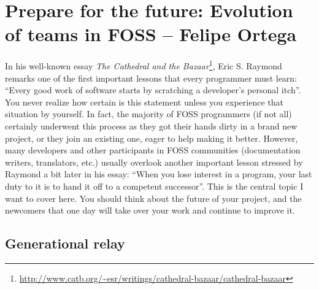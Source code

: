 \chapter{Prepare for the future: Evolution of teams in FOSS -- Felipe Ortega}
In his well-known essay \textit{The Cathedral and the Bazaar}\footnote{\url{http://www.catb.org/~esr/writings/cathedral-bazaar/cathedral-bazaar}}, Eric S. Raymond remarks one of the first important lessons that every programmer must learn: “Every good work of software starts by scratching a developer's personal itch”. You never realize how certain is this statement unless you experience that situation by yourself. In fact, the majority of FOSS programmers (if not all) certainly underwent this process as they got their hands dirty in a brand new project, or they join an existing one, eager to help making it better.
However, many developers and other participants in FOSS communities (documentation writers, translators, etc.) usually overlook another important lesson stressed by Raymond a bit later in his essay: “When you lose interest in a program, your last duty to it is to hand it off to a competent successor”. This is the central topic I want to cover here. You should think about the future of your project, and the newcomers that one day will take over your work and continue to improve it.

\section*{Generational relay}

